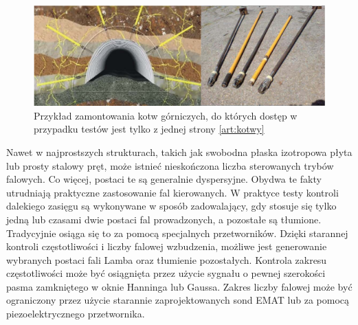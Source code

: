 \begin{figure}[h]
\centering
\includegraphics[width=14cm]{Zdjecia/4/kotwy}
\caption{Przykład zamontowania kotw górniczych, do których dostęp w przypadku testów jest tylko z jednej strony \ref{art:kotwy}}
\label{fig:kotwy}
\end{figure}

Nawet w najprostszych strukturach, takich jak swobodna płaska izotropowa płyta lub prosty stalowy pręt, może istnieć nieskończona liczba sterowanych trybów falowych. Co więcej, postaci te są generalnie dyspersyjne. Obydwa te fakty utrudniają praktyczne zastosowanie fal kierowanych. W praktyce testy kontroli dalekiego zasięgu są wykonywane w sposób zadowalający, gdy stosuje się tylko jedną lub czasami dwie postaci fal prowadzonych, a pozostałe są tłumione. Tradycyjnie osiąga się to za pomocą specjalnych przetworników. Dzięki starannej kontroli częstotliwości i liczby falowej wzbudzenia, możliwe jest generowanie wybranych postaci fali Lamba oraz tłumienie pozostałych. Kontrola zakresu częstotliwości może być osiągnięta przez użycie sygnału o pewnej szerokości pasma zamkniętego w oknie Hanninga lub Gaussa. Zakres liczby falowej może być ograniczony przez użycie starannie zaprojektowanych sond EMAT lub za pomocą piezoelektrycznego przetwornika. 

